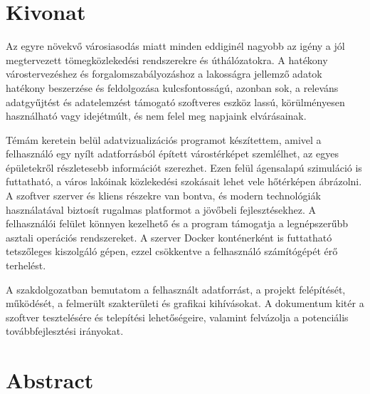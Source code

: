 \setcounter{page}{1}

\selecthungarian

\chapter*{Kivonat}

Az egyre növekvő városiasodás miatt minden eddiginél nagyobb az igény a jól megtervezett tömegközlekedési rendszerekre és úthálózatokra. A hatékony várostervezéshez és forgalomszabályozáshoz a lakosságra jellemző adatok hatékony beszerzése és feldolgozása kulcsfontosságú, azonban sok, a releváns adatgyűjtést és adatelemzést támogató szoftveres eszköz lassú, körülményesen használható vagy idejétmúlt, és nem felel meg napjaink elvárásainak.

Témám keretein belül adatvizualizációs programot készítettem, amivel a felhasználó egy nyílt adatforrásból épített várostérképet szemlélhet, az egyes épületekről részletesebb információt szerezhet. Ezen felül ágensalapú szimuláció is futtatható, a város lakóinak közlekedési szokásait lehet vele hőtérképen ábrázolni. A szoftver szerver és kliens részekre van bontva, és modern technológiák használatával biztosít rugalmas platformot a jövőbeli fejlesztésekhez. A felhasználói felület könnyen kezelhető és a program támogatja a legnépszerűbb asztali operációs rendszereket. A szerver Docker konténerként is futtatható tetszőleges kiszolgáló gépen, ezzel csökkentve a felhasználó számítógépét érő terhelést.

A szakdolgozatban bemutatom a felhasznált adatforrást, a projekt felépítését, működését, a felmerült szakterületi és grafikai kihívásokat. A dokumentum kitér a szoftver tesztelésére és telepítési lehetőségeire, valamint felvázolja a potenciális továbbfejlesztési irányokat.



\vfill
\selectenglish


\chapter*{Abstract}

